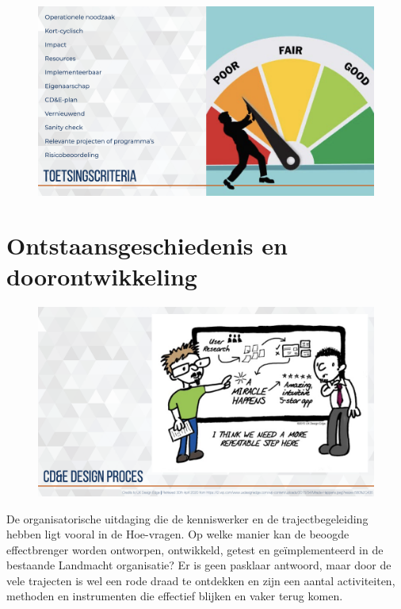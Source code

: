 \documentclass[
]{book}
\begin{document}
\begin{figure}
\includegraphics[width=26.67in]{data/keynote-slides/20200430-CDE-Designprocess/20200430-CDE-Designprocess.038} \caption{ }\label{fig:unnamed-chunk-25}
\end{figure}

\hypertarget{cde-process}{%
\chapter{Ontstaansgeschiedenis en doorontwikkeling}\label{cde-process}}

\begin{figure}
\includegraphics[width=26.67in]{data/keynote-slides/20200430-CDE-Designprocess/20200430-CDE-Designprocess.018} \caption{ }\label{fig:unnamed-chunk-26}
\end{figure}

De organisatorische uitdaging die de kenniswerker en de trajectbegeleiding hebben ligt vooral in de Hoe-vragen. Op welke manier kan de beoogde effectbrenger worden ontworpen, ontwikkeld, getest en geïmplementeerd in de bestaande Landmacht organisatie? Er is geen pasklaar antwoord, maar door de vele trajecten is wel een rode draad te ontdekken en zijn een aantal activiteiten, methoden en instrumenten die effectief blijken en vaker terug komen.
\end{document}
